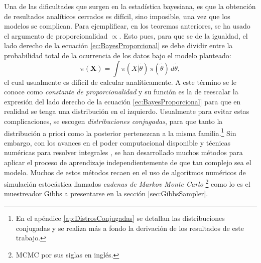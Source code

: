 \documentclass[../Main/Main.tex]{subfiles}
\begin{document}
Una de las dificultades que surgen en la estadística bayesiana, es que la obtención de resultados analíticos cerrados es difícil, sino imposible, una vez que los modelos se complican. Para ejemplificar, en los teoremas anteriores, se ha usado el argumento de proporcionalidad $\propto$. Esto pues, para que se de la igualdad, el lado derecho de la ecuación \eqref{ec:BayesProporcional} se debe dividir entre la probabilidad total de la ocurrencia de los datos bajo el modelo planteado: $$\pi(\mathbf{X}) = \int \pi(X|\tilde{\theta})\,\pi(\tilde{\theta})\,d\tilde{\theta},$$ el cual usualmente es difícil de calcular analíticamente. A este término se le conoce como \textit{constante de proporcionalidad} y su función es la de reescalar la expresión del lado derecho de la ecuación \eqref{ec:BayesProporcional} para que en realidad se tenga una distribución en el izquierdo. Usualmente para evitar estas complicaciones, se escogen \textit{distribuciones conjugadas}, para que tanto la distribución a priori como la posterior pertenezcan a la misma familia.\footnote{En el apéndice \ref{ap:DistrosConjugadas} se detallan las distribuciones conjugadas y se realiza más a fondo la derivación de los resultados de este trabajo.} Sin embargo, con los avances en el poder computacional disponible y técnicas numéricas para resolver integrales \autocite{robert2004monte}, se han desarrollado muchos métodos para aplicar el proceso de aprendizaje independientemente de que tan complejo sea el modelo. Muchos de estos métodos recaen en el uso de algoritmos numéricos de simulación estocástica llamados \emph{cadenas de Markov Monte Carlo} \footnote{MCMC por sus siglas en inglés.} como lo es el muestreador Gibbs a presentarse en la sección \ref{sec:GibbsSampler}. 
\end{document}
